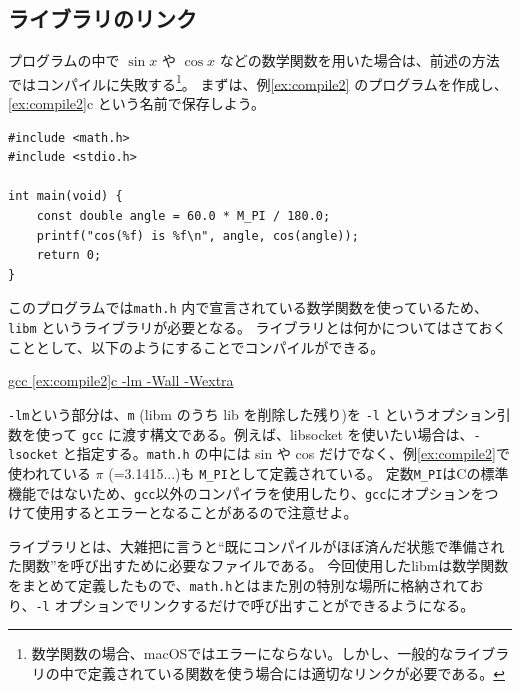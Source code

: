 \subsection{ライブラリのリンク}
プログラムの中で \(\sin x\) や \(\cos x\) などの数学関数を用いた場合は、前述の方法ではコンパイルに失敗する\footnote{数学関数の場合、macOSではエラーにならない。しかし、一般的なライブラリの中で定義されている関数を使う場合には適切なリンクが必要である。}。
まずは、例\ref{ex:compile2} のプログラムを作成し、\ref{ex:compile2}c という名前で保存しよう。
\begin{reidai}\label{ex:compile2}
    \begin{verbatim}
#include <math.h>
#include <stdio.h>

int main(void) {
    const double angle = 60.0 * M_PI / 180.0;
    printf("cos(%f) is %f\n", angle, cos(angle));
    return 0;
}
\end{verbatim}
\end{reidai} \noindent
このプログラムでは\texttt{math.h} 内で宣言されている数学関数を使っているため、\texttt{libm} というライブラリが必要となる。
ライブラリとは何かについてはさておくこととして、以下のようにすることでコンパイルができる。
\begin{commandline2}
    \prompt \underline{gcc \ref{ex:compile2}c -lm -Wall -Wextra}
\end{commandline2} \noindent
\texttt{-lm}という部分は、\texttt{m} (libm のうち lib を削除した残り)を \texttt{-l} というオプション引数を使って \texttt{gcc} に渡す構文である。例えば、libsocket を使いたい場合は、\texttt{-lsocket} と指定する。\texttt{math.h} の中には sin や cos だけでなく、例\ref{ex:compile2}で使われている \(\pi\) (=3.1415...)も \texttt{M\_PI}として定義されている。
定数\texttt{M\_PI}はCの標準機能ではないため、\texttt{gcc}以外のコンパイラを使用したり、\texttt{gcc}にオプションをつけて使用するとエラーとなることがあるので注意せよ。

ライブラリとは、大雑把に言うと``既にコンパイルがほぼ済んだ状態で準備された関数''を呼び出すために必要なファイルである。
今回使用したlibmは数学関数をまとめて定義したもので、\texttt{math.h}とはまた別の特別な場所に格納されており、\texttt{-l} オプションでリンクするだけで呼び出すことができるようになる。

